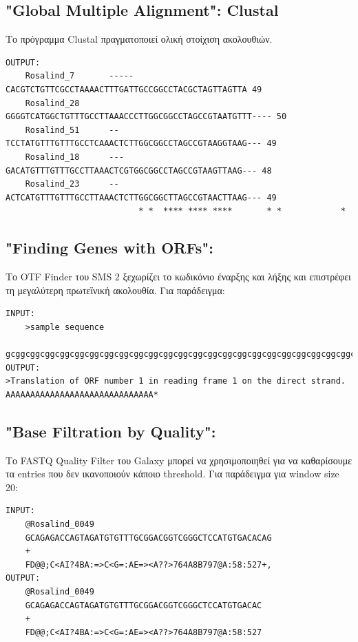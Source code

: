     \subsection{"Global Multiple Alignment": Clustal}
        Το πρόγραμμα Clustal πραγματοποιεί ολική στοίχιση ακολουθιών.
    \begin{graycomment} \footnotesize
    \begin{verbatim}
OUTPUT:
    Rosalind_7       -----CACGTCTGTTCGCCTAAAACTTTGATTGCCGGCCTACGCTAGTTAGTTA	49
    Rosalind_28      GGGGTCATGGCTGTTTGCCTTAAACCCTTGGCGGCCTAGCCGTAATGTTT----	50
    Rosalind_51      --TCCTATGTTTGTTTGCCTCAAACTCTTGGCGGCCTAGCCGTAAGGTAAG---	49
    Rosalind_18      ---GACATGTTTGTTTGCCTTAAACTCGTGGCGGCCTAGCCGTAAGTTAAG---	48
    Rosalind_23      --ACTCATGTTTGTTTGCCTTAAACTCTTGGCGGCTTAGCCGTAACTTAAG---	49
                           * *  **** **** ****       * *            *\end{verbatim}
    \end{graycomment}

    \subsection{"Finding Genes with ORFs": }
        Το OTF Finder του SMS 2 ξεχωρίζει το κωδικόνιο έναρξης και λήξης και επιστρέφει τη μεγαλύτερη πρωτεϊνική ακολουθία. Για παράδειγμα:
\begin{graycomment} \footnotesize
    \begin{verbatim}
INPUT:
    >sample sequence
    gcggcggcggcggcggcggcggcggcggcggcggcggcggcggcggcggcggcggcggcggcggcggcggcggcggcg...
OUTPUT:
>Translation of ORF number 1 in reading frame 1 on the direct strand.
AAAAAAAAAAAAAAAAAAAAAAAAAAAAAA*\end{verbatim}
\end{graycomment}

    \subsection{"Base Filtration by Quality": }
        Το FASTQ Quality Filter του Galaxy μπορεί να χρησιμοποιηθεί για να καθαρίσουμε τα entries που δεν ικανοποιούν κάποιο threshold.
        Για παράδειγμα για window size 20:
    \begin{graycomment} \footnotesize
    \begin{verbatim}
INPUT:
    @Rosalind_0049
    GCAGAGACCAGTAGATGTGTTTGCGGACGGTCGGGCTCCATGTGACACAG
    +
    FD@@;C<AI?4BA:=>C<G=:AE=><A??>764A8B797@A:58:527+,
OUTPUT:
    @Rosalind_0049
    GCAGAGACCAGTAGATGTGTTTGCGGACGGTCGGGCTCCATGTGACAC
    +
    FD@@;C<AI?4BA:=>C<G=:AE=><A??>764A8B797@A:58:527\end{verbatim}
    \end{graycomment}

